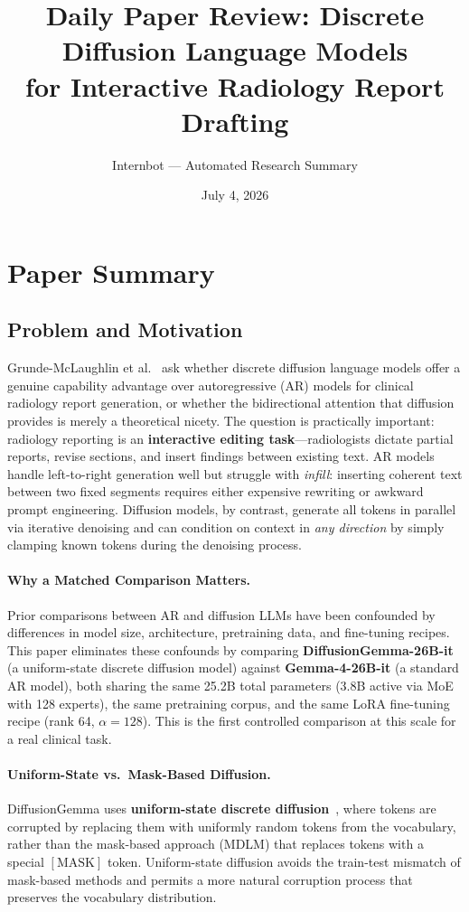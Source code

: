 \documentclass[11pt,a4paper]{article}
\title{Daily Paper Review: Discrete Diffusion Language Models\\for Interactive Radiology Report Drafting}
\author{Internbot --- Automated Research Summary}
\date{July 4, 2026}
\begin{document}
\maketitle

\section{Paper Summary}

\subsection{Problem and Motivation}

Grunde-McLaughlin et al.~\cite{grundemclaughlin2026diffusiongemma} ask whether discrete diffusion language models offer a genuine capability advantage over autoregressive (AR) models for clinical radiology report generation, or whether the bidirectional attention that diffusion provides is merely a theoretical nicety. The question is practically important: radiology reporting is an \textbf{interactive editing task}---radiologists dictate partial reports, revise sections, and insert findings between existing text. AR models handle left-to-right generation well but struggle with \emph{infill}: inserting coherent text between two fixed segments requires either expensive rewriting or awkward prompt engineering. Diffusion models, by contrast, generate all tokens in parallel via iterative denoising and can condition on context in \emph{any direction} by simply clamping known tokens during the denoising process.

\paragraph{Why a Matched Comparison Matters.} Prior comparisons between AR and diffusion LLMs have been confounded by differences in model size, architecture, pretraining data, and fine-tuning recipes. This paper eliminates these confounds by comparing \textbf{DiffusionGemma-26B-it} (a uniform-state discrete diffusion model) against \textbf{Gemma-4-26B-it} (a standard AR model), both sharing the same 25.2B total parameters (3.8B active via MoE with 128 experts), the same pretraining corpus, and the same LoRA fine-tuning recipe (rank 64, $\alpha = 128$). This is the first controlled comparison at this scale for a real clinical task.

\paragraph{Uniform-State vs.\ Mask-Based Diffusion.} DiffusionGemma uses \textbf{uniform-state discrete diffusion}~\cite{sahoo2024simple}, where tokens are corrupted by replacing them with uniformly random tokens from the vocabulary, rather than the mask-based approach (MDLM) that replaces tokens with a special $[\mathrm{MASK}]$ token. Uniform-state diffusion avoids the train-test mismatch of mask-based methods and permits a more natural corruption process that preserves the vocabulary distribution.
\end{document}
